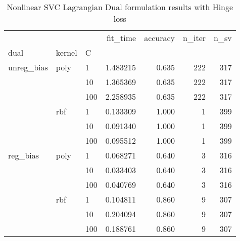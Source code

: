 \begin{table}[H]
\centering
\caption{Nonlinear SVC Lagrangian Dual formulation results with Hinge loss}
\label{nonlinear_lagrangian_dual_svc_cv_results}
\begin{tabular}{lllrrrr}
\toprule
         &     &     &  fit\_time &  accuracy &  n\_iter &  n\_sv \\
dual & kernel & C &           &           &         &       \\
\midrule
unreg\_bias & poly & 1   &  1.483215 &     0.635 &     222 &   317 \\
         &     & 10  &  1.365369 &     0.635 &     222 &   317 \\
         &     & 100 &  2.258935 &     0.635 &     222 &   317 \\
         & rbf & 1   &  0.133309 &     1.000 &       1 &   399 \\
         &     & 10  &  0.091340 &     1.000 &       1 &   399 \\
         &     & 100 &  0.095512 &     1.000 &       1 &   399 \\
reg\_bias & poly & 1   &  0.068271 &     0.640 &       3 &   316 \\
         &     & 10  &  0.033403 &     0.640 &       3 &   316 \\
         &     & 100 &  0.040769 &     0.640 &       3 &   316 \\
         & rbf & 1   &  0.104811 &     0.860 &       9 &   307 \\
         &     & 10  &  0.204094 &     0.860 &       9 &   307 \\
         &     & 100 &  0.188761 &     0.860 &       9 &   307 \\
\bottomrule
\end{tabular}
\end{table}
